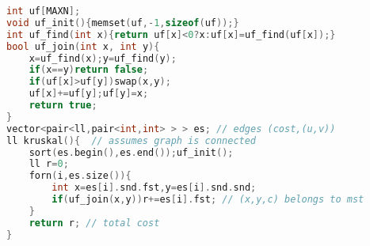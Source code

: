 \begin{lstlisting}[language=C++]
int uf[MAXN];
void uf_init(){memset(uf,-1,sizeof(uf));}
int uf_find(int x){return uf[x]<0?x:uf[x]=uf_find(uf[x]);}
bool uf_join(int x, int y){
	x=uf_find(x);y=uf_find(y);
	if(x==y)return false;
	if(uf[x]>uf[y])swap(x,y);
	uf[x]+=uf[y];uf[y]=x;
	return true;
}
vector<pair<ll,pair<int,int> > > es; // edges (cost,(u,v))
ll kruskal(){  // assumes graph is connected
	sort(es.begin(),es.end());uf_init();
	ll r=0;
	forn(i,es.size()){
		int x=es[i].snd.fst,y=es[i].snd.snd;
		if(uf_join(x,y))r+=es[i].fst; // (x,y,c) belongs to mst
	}
	return r; // total cost
}
\end{lstlisting}
